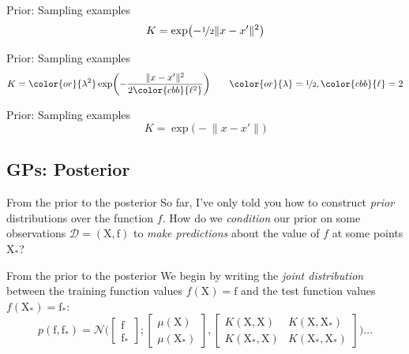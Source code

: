 \documentclass[xcolor={dvipsnames},hyperref={breaklinks=true},12pt]{beamer}
\newcommand{\mc}[1]{\mathcal{#1}}
\newcommand{\data}{\mc{D}}
\newcommand{\mat}[1]{\bm{\mathrm{#1}}}
\renewcommand{\vec}[1]{\bm{\mathrm{#1}}}
\newcommand{\emphr}[1]{{\textcolor{or}{\itshape #1}}}
\newcommand{\maker}[1]{{\color{or}{#1}}}
\newcommand{\makeb}[1]{{\color{cbb}{#1}}}
\begin{document}
\begin{frame}{Prior: Sampling examples}
  \hspace*{-1.5em}
  \begin{equation*}
    K = \exp\bigl(-\nicefrac{1}{2}\lVert x - x' \rVert^2\bigr)
  \end{equation*}
\end{frame}

\begin{frame}{Prior: Sampling examples}
  \hspace*{-1.5em}
  \begin{equation*}
    K = \maker{\lambda^2}\exp\biggl(-\frac{\lVert x - x' \rVert^2}{2\makeb{\ell^2}}\biggr)
    \qquad
    \maker{\lambda} = \nicefrac{1}{2}, \makeb{\ell} = 2
  \end{equation*}
\end{frame}

\begin{frame}{Prior: Sampling examples}
  \hspace*{-1.5em}
  \begin{equation*}
    K = \exp\bigl(-\lVert x - x' \rVert\bigr)
  \end{equation*}
\end{frame}

\subsection{GPs: Posterior}

\begin{frame}{From the prior to the posterior}
  So far, I've only told you how to construct \emphr{prior}
  distributions over the function $f$.  How do we \emphr{condition}
  our prior on some observations $\data = (\mat{X}, \vec{f})$ to
  \emphr{make predictions} about the value of $f$ at some points
  $\mat{X}_\ast$?
\end{frame}

\begin{frame}{From the prior to the posterior}
  We begin by writing the \emphr{joint distribution} between the
  training function values $f(\mat{X}) = \vec{f}$ and the test function
  values $f(\mat{X}_\ast) = \vec{f}_\ast$:
  \begin{equation*}
    p(\vec{f}, \vec{f}_\ast) =
    \mc{N}\Biggl(
    \begin{bmatrix} \vec{f} \\ \vec{f}_\ast \end{bmatrix};
    \begin{bmatrix} \mu(\mat{X}) \\ \mu(\mat{X}_\ast) \end{bmatrix},
    \begin{bmatrix} K(\mat{X}, \mat{X}) & K(\mat{X}, \mat{X}_\ast) \\ K(\mat{X}_\ast, \mat{X}) & K(\mat{X}_\ast, \mat{X}_\ast) \end{bmatrix}
    \Biggl)\dotsc
  \end{equation*}
\end{frame}
\end{document}
